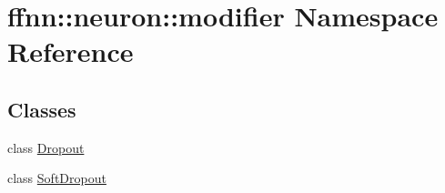 \hypertarget{namespaceffnn_1_1neuron_1_1modifier}{\section{ffnn\-:\-:neuron\-:\-:modifier Namespace Reference}
\label{namespaceffnn_1_1neuron_1_1modifier}
}
\subsection*{Classes}
\begin{DoxyCompactItemize}
\item 
class \hyperlink{classffnn_1_1neuron_1_1modifier_1_1_dropout}{Dropout}
\item 
class \hyperlink{classffnn_1_1neuron_1_1modifier_1_1_soft_dropout}{Soft\-Dropout}
\end{DoxyCompactItemize}
